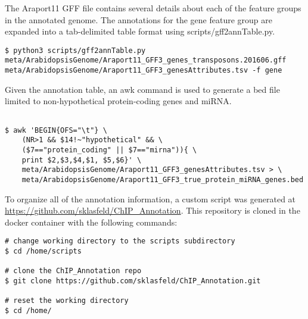 \documentclass{article}
\begin{document}
\begin{sloppypar}
The Araport11 GFF file contains several details about each of the feature groups in the annotated genome. The annotations for the gene feature group are expanded into a tab-delimited table format using {\selectfont scripts/gff2annTable.py}.

\begin{verbatim}
$ python3 scripts/gff2annTable.py meta/ArabidopsisGenome/Araport11_GFF3_genes_transposons.201606.gff meta/ArabidopsisGenome/Araport11_GFF3_genesAttributes.tsv -f gene
\end{verbatim}

Given the annotation table, an awk command is used to generate a bed file limited to non-hypothetical protein-coding genes and miRNA.

\begin{verbatim}

$ awk 'BEGIN{OFS="\t"} \
    (NR>1 && $14!~"hypothetical" && \
    ($7=="protein_coding" || $7=="mirna")){ \
    print $2,$3,$4,$1, $5,$6}' \
    meta/ArabidopsisGenome/Araport11_GFF3_genesAttributes.tsv > \
    meta/ArabidopsisGenome/Araport11_GFF3_true_protein_miRNA_genes.bed
\end{verbatim}

To organize all of the annotation information, a custom script was generated at \url{https://github.com/sklasfeld/ChIP_Annotation}. This repository is cloned in the docker container with the following commands:
\begin{verbatim}
# change working directory to the scripts subdirectory
$ cd /home/scripts

# clone the ChIP_Annotation repo
$ git clone https://github.com/sklasfeld/ChIP_Annotation.git

# reset the working directory
$ cd /home/
\end{verbatim}


\end{sloppypar}
\end{document}
